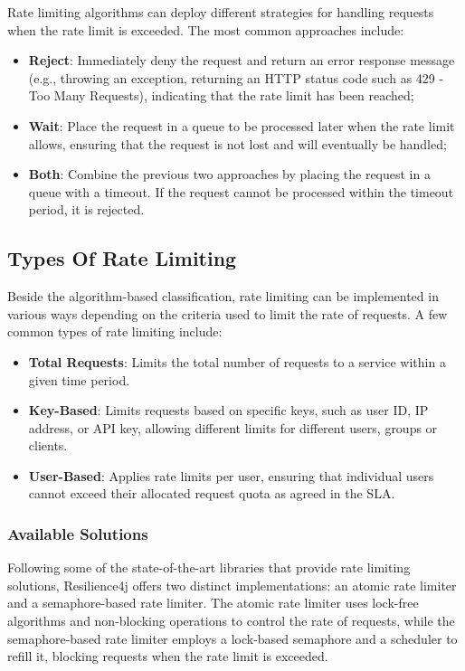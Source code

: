 Rate limiting algorithms can deploy different strategies for handling requests when the rate limit is exceeded.
The most common approaches include:

\begin{itemize}
    \item \textbf{Reject}: Immediately deny the request and return an error response message (e.g., throwing an exception,
    returning an HTTP status code such as 429 - Too Many Requests), indicating that the rate limit has been reached;
    \item \textbf{Wait}: Place the request in a queue to be processed later when the rate limit allows, ensuring that the request is not lost and will eventually be handled;
    \item \textbf{Both}: Combine the previous two approaches by placing the request in a queue with a timeout.
    If the request cannot be processed within the timeout period, it is rejected.
\end{itemize}

\subsection{Types Of Rate Limiting}\label{subsec:rate-limiter-types}

Beside the algorithm-based classification, rate limiting can be implemented in various ways depending on the criteria used to limit the rate of requests.
A few common types of rate limiting include:
\begin{itemize}
    \item \textbf{Total Requests}: Limits the total number of requests to a service within a given time period.
    \item \textbf{Key-Based}: Limits requests based on specific keys, such as user ID, IP address, or API key,
    allowing different limits for different users, groups or clients.
    \item \textbf{User-Based}: Applies rate limits per user,
    ensuring that individual users cannot exceed their allocated request quota as agreed in the SLA.
\end{itemize}

\subsubsection{Available Solutions}\label{subsubsec:rate-limiter-solutions}

Following some of the state-of-the-art libraries that provide rate limiting solutions,
Resilience4j offers two distinct implementations: an atomic rate limiter and a semaphore-based rate limiter.
The atomic rate limiter uses lock-free algorithms and non-blocking operations to control the rate of requests,
while the semaphore-based rate limiter employs a lock-based semaphore and a scheduler to refill it,
blocking requests when the rate limit is exceeded.

